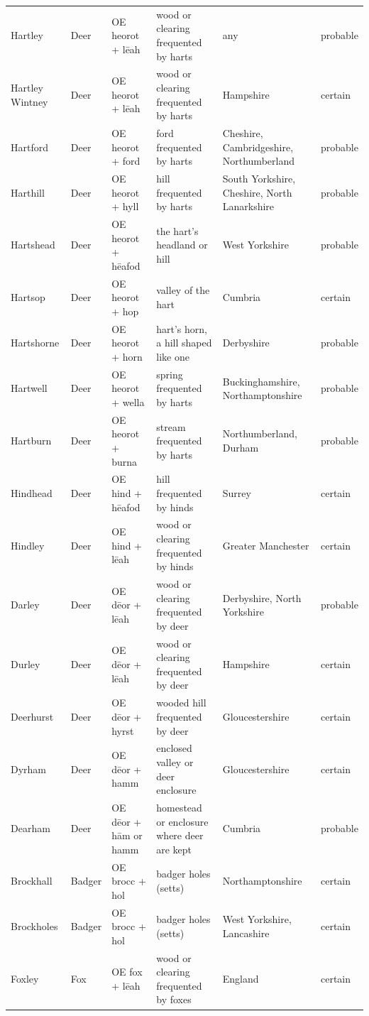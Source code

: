 \documentclass[11pt,a4paper]{article}
\begin{document}
\begin{small}
\begin{longtable}{R{2.2cm}R{1.3cm}R{2.6cm}R{3.7cm}R{2.7cm}l}
Hartley & Deer & OE heorot + lēah & wood or clearing frequented by harts & any & probable\\
Hartley Wintney & Deer & OE heorot + lēah & wood or clearing frequented by harts & Hampshire & certain\\
Hartford & Deer & OE heorot + ford & ford frequented by harts & Cheshire, Cambridgeshire, Northumberland & probable\\
Harthill & Deer & OE heorot + hyll & hill frequented by harts & South Yorkshire, Cheshire, North Lanarkshire & probable\\
Hartshead & Deer & OE heorot + hēafod & the hart's headland or hill & West Yorkshire & probable\\
Hartsop & Deer & OE heorot + hop & valley of the hart & Cumbria & certain\\
Hartshorne & Deer & OE heorot + horn & hart's horn, a hill shaped like one & Derbyshire & probable\\
Hartwell & Deer & OE heorot + wella & spring frequented by harts & Buckinghamshire, Northamptonshire & probable\\
Hartburn & Deer & OE heorot + burna & stream frequented by harts & Northumberland, Durham & probable\\
Hindhead & Deer & OE hind + hēafod & hill frequented by hinds & Surrey & certain\\
Hindley & Deer & OE hind + lēah & wood or clearing frequented by hinds & Greater Manchester & certain\\
Darley & Deer & OE dēor + lēah & wood or clearing frequented by deer & Derbyshire, North Yorkshire & probable\\
Durley & Deer & OE dēor + lēah & wood or clearing frequented by deer & Hampshire & certain\\
Deerhurst & Deer & OE dēor + hyrst & wooded hill frequented by deer & Gloucestershire & certain\\
Dyrham & Deer & OE dēor + hamm & enclosed valley or deer enclosure & Gloucestershire & certain\\
Dearham & Deer & OE dēor + hām or hamm & homestead or enclosure where deer are kept & Cumbria & probable\\
Brockhall & Badger & OE brocc + hol & badger holes (setts) & Northamptonshire & certain\\
Brockholes & Badger & OE brocc + hol & badger holes (setts) & West Yorkshire, Lancashire & certain\\
Foxley & Fox & OE fox + lēah & wood or clearing frequented by foxes & England & certain\\

\end{longtable}
\end{small}
\end{document}
